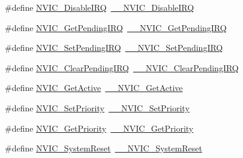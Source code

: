 \begin{DoxyCompactItemize}
\item 
\#define \hyperlink{group___c_m_s_i_s___core___n_v_i_c_functions_ga73b4e251f59cab4e9a5e234aac02ae57}{N\+V\+I\+C\+\_\+\+Disable\+I\+RQ}~\hyperlink{group___c_m_s_i_s___core___n_v_i_c_functions_gae016e4c1986312044ee768806537d52f}{\+\_\+\+\_\+\+N\+V\+I\+C\+\_\+\+Disable\+I\+RQ}
\item 
\#define \hyperlink{group___c_m_s_i_s___core___n_v_i_c_functions_gac608957a239466e9e0cbc30aa64feb3b}{N\+V\+I\+C\+\_\+\+Get\+Pending\+I\+RQ}~\hyperlink{group___c_m_s_i_s___core___n_v_i_c_functions_ga5a92ca5fa801ad7adb92be7257ab9694}{\+\_\+\+\_\+\+N\+V\+I\+C\+\_\+\+Get\+Pending\+I\+RQ}
\item 
\#define \hyperlink{group___c_m_s_i_s___core___n_v_i_c_functions_ga2b47e2e52cf5c48a5c3348636434b3ac}{N\+V\+I\+C\+\_\+\+Set\+Pending\+I\+RQ}~\hyperlink{group___c_m_s_i_s___core___n_v_i_c_functions_gaabefdd4b790b9a7308929938c0c1e1ad}{\+\_\+\+\_\+\+N\+V\+I\+C\+\_\+\+Set\+Pending\+I\+RQ}
\item 
\#define \hyperlink{group___c_m_s_i_s___core___n_v_i_c_functions_ga590cf113000a079b1f0ea3dcd5b5316c}{N\+V\+I\+C\+\_\+\+Clear\+Pending\+I\+RQ}~\hyperlink{group___c_m_s_i_s___core___n_v_i_c_functions_ga562a86dbdf14827d0fee8fdafb04d191}{\+\_\+\+\_\+\+N\+V\+I\+C\+\_\+\+Clear\+Pending\+I\+RQ}
\item 
\#define \hyperlink{group___c_m_s_i_s___core___n_v_i_c_functions_ga58ad3f352f832235ab3b192ff4745320}{N\+V\+I\+C\+\_\+\+Get\+Active}~\hyperlink{group___c_m_s_i_s___core___n_v_i_c_functions_gaa2837003c28c45abf193fe5e8d27f593}{\+\_\+\+\_\+\+N\+V\+I\+C\+\_\+\+Get\+Active}
\item 
\#define \hyperlink{group___c_m_s_i_s___core___n_v_i_c_functions_gae0e9d0e2f7b6133828c71b57d4941c35}{N\+V\+I\+C\+\_\+\+Set\+Priority}~\hyperlink{group___c_m_s_i_s___core___n_v_i_c_functions_ga505338e23563a9c074910fb14e7d45fd}{\+\_\+\+\_\+\+N\+V\+I\+C\+\_\+\+Set\+Priority}
\item 
\#define \hyperlink{group___c_m_s_i_s___core___n_v_i_c_functions_gaf59b9d0a791d2157abb319753953eceb}{N\+V\+I\+C\+\_\+\+Get\+Priority}~\hyperlink{group___c_m_s_i_s___core___n_v_i_c_functions_gaeb9dc99c8e7700668813144261b0bc73}{\+\_\+\+\_\+\+N\+V\+I\+C\+\_\+\+Get\+Priority}
\item 
\#define \hyperlink{group___c_m_s_i_s___core___n_v_i_c_functions_ga6aa0367d3642575610476bf0366f0c48}{N\+V\+I\+C\+\_\+\+System\+Reset}~\hyperlink{group___c_m_s_i_s___core___n_v_i_c_functions_ga0d9aa2d30fa54b41eb780c16e35b676c}{\+\_\+\+\_\+\+N\+V\+I\+C\+\_\+\+System\+Reset}
\item 

\end{DoxyCompactItemize}
